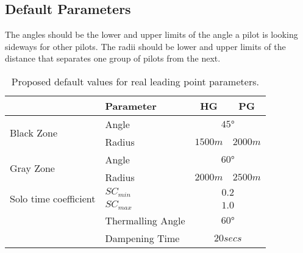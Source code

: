 \documentclass[gap.tex]{subfiles}
\begin{document}
\subsection{Default Parameters}
The angles should be the lower and upper limits of the angle a pilot is looking
sideways for other pilots.  The radii should be lower and upper limits of the
distance that separates one group of pilots from the next.

\begin{table}[!ht]
    \begin{tabularx}{\textwidth}{|l|X|c|c|}
    \hline
        & \textbf{Parameter}
        & \textbf{HG}
        & \textbf{PG}
        \\
    \hline
        \multirow{2}{*}{Black Zone}
        & Angle
        & \multicolumn{2}{c|}{$45°$}
        \\
    \cline{2-4}
        & Radius
        & $1500 m$
        & $2000 m$
        \\
    \hline
        \multirow{2}{*}{Gray Zone}
        & Angle
        & \multicolumn{2}{c|}{$60°$}
        \\
    \cline{2-4}
        & Radius
        & $2000 m$
        & $2500 m$
        \\
    \hline
        \multirow{2}{*}{Solo time coefficient}
        & $SC_{min}$
        & \multicolumn{2}{c|}{$0.2$}
        \\
    \cline{2-4}
        & $SC_{max}$
        & \multicolumn{2}{c|}{$1.0$}
        \\
    \hline
        \multirow{3}{*}{}
        & Thermalling Angle
        & \multicolumn{2}{c|}{$60°$}
        \\
    \cline{2-4}
        & Dampening Time
        & \multicolumn{2}{c|}{$20 secs$}
        \\
    \hline
    \end{tabularx}
    \caption{Proposed default values for real leading point parameters.}
    \label{tab:gap-defaults}
\end{table}
\end{document}
